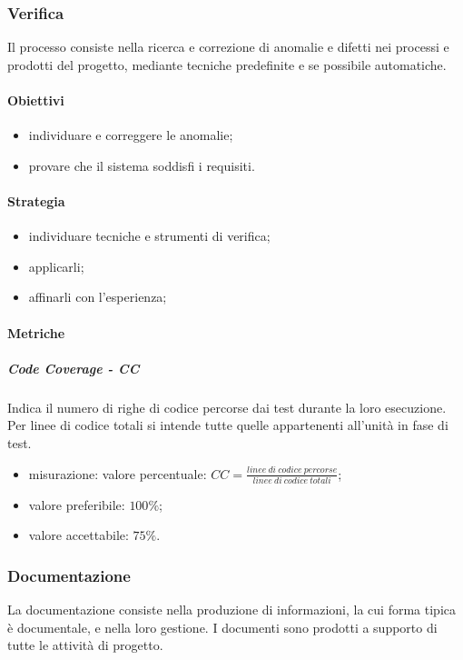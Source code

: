 	\subsubsection{Verifica}
	Il processo consiste nella ricerca e correzione di anomalie e difetti nei processi e prodotti del progetto, mediante tecniche predefinite e se possibile automatiche.
		\paragraph{Obiettivi}
		\begin{itemize}
			\item individuare e correggere le anomalie;
			\item provare che il sistema soddisfi i requisiti.
		\end{itemize}	
		\paragraph{Strategia}
		\begin{itemize}
			\item individuare tecniche e strumenti di verifica;
			\item applicarli;
			\item affinarli con l'esperienza;
		\end{itemize}	
		\paragraph{Metriche}
			\subparagraph{Code Coverage - CC}
				Indica il numero di righe di codice percorse dai test durante la loro esecuzione. Per linee di codice totali si intende tutte quelle appartenenti all'unità in fase di test.
				\begin{itemize}
					\item misurazione: valore percentuale: $CC = \frac{linee\ di\ codice\ percorse}{linee\ di\ codice\ totali}$;
					\item valore preferibile: $100\%$;
					\item valore accettabile: $75\%$.
				\end{itemize}

	\subsubsection{Documentazione}
	La documentazione consiste nella produzione di informazioni, la cui forma tipica è  documentale, e nella loro gestione. I documenti sono prodotti a supporto di tutte le attività di progetto.
